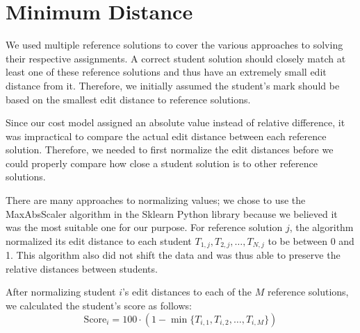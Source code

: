 \section{Minimum Distance}

We used multiple reference solutions to cover the various approaches to solving their respective assignments. A correct student solution should closely match at least one of these reference solutions and thus have an extremely small edit distance from it. Therefore, we initially assumed the student's mark should be based on the smallest edit distance to reference solutions.

Since our cost model assigned an absolute value instead of relative difference, it was impractical to compare the actual edit distance between each reference solution. Therefore, we needed to first normalize the edit distances before we could properly compare how close a student solution is to other reference solutions.

There are many approaches to normalizing values; we chose to use the MaxAbsScaler algorithm in the Sklearn Python library \cite{MaxAbsScaler} because we believed it was the most suitable one for our purpose. For reference solution $j$, the algorithm normalized its edit distance to each student $T_{1,j}, T_{2,j}, \ldots, T_{N,j}$ to be between 0 and 1. This algorithm also did not shift the data and was thus able to preserve the relative distances between students.

After normalizing student $i$'s edit distances to each of the $M$ reference solutions, we calculated the student's score as follows:
\begin{equation*}
\text{Score}_i = 100 \cdot (1 - \min \{ T_{i,1}, T_{i,2}, \ldots, T_{i,M} \})
\end{equation*}
